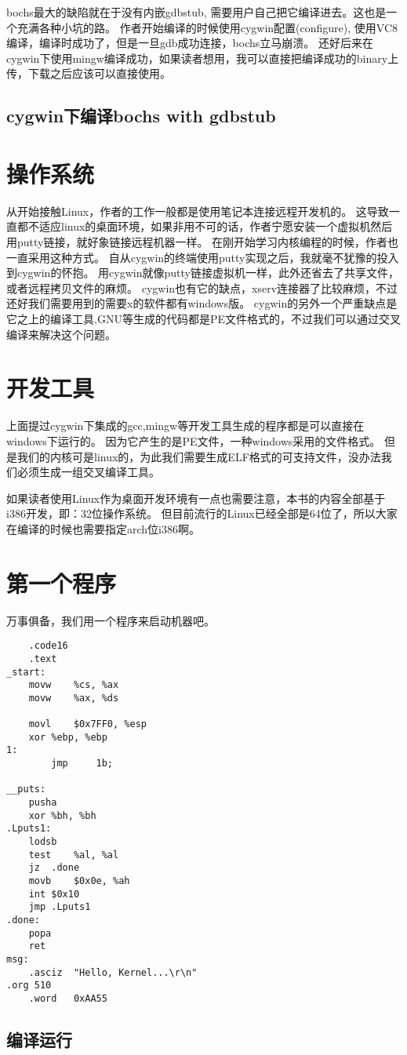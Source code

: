 bochs最大的缺陷就在于没有内嵌gdbstub, 需要用户自己把它编译进去。这也是一个充满各种小坑的路。
作者开始编译的时候使用cygwin配置(configure), 使用VC8编译，编译时成功了，但是一旦gdb成功连接，bochs立马崩溃。
还好后来在cygwin下使用mingw编译成功，如果读者想用，我可以直接把编译成功的binary上传，下载之后应该可以直接使用。

\subsection{cygwin下编译bochs with gdbstub}
\section{操作系统}
从开始接触Linux，作者的工作一般都是使用笔记本连接远程开发机的。
这导致一直都不适应linux的桌面环境，如果非用不可的话，作者宁愿安装一个虚拟机然后用putty链接，就好象链接远程机器一样。
在刚开始学习内核编程的时候，作者也一直采用这种方式。
自从cygwin的终端使用putty实现之后，我就毫不犹豫的投入到cygwin的怀抱。
用cygwin就像putty链接虚拟机一样，此外还省去了共享文件，或者远程拷贝文件的麻烦。
cygwin也有它的缺点，xserv连接器了比较麻烦，不过还好我们需要用到的需要x的软件都有windows版。
cygwin的另外一个严重缺点是它之上的编译工具,GNU等生成的代码都是PE文件格式的，不过我们可以通过交叉编译来解决这个问题。
\section{开发工具}

上面提过cygwin下集成的gcc,mingw等开发工具生成的程序都是可以直接在windows下运行的。
因为它产生的是PE文件，一种windows采用的文件格式。
但是我们的内核可是linux的，为此我们需要生成ELF格式的可支持文件，没办法我们必须生成一组交叉编译工具。

如果读者使用Linux作为桌面开发环境有一点也需要注意，本书的内容全部基于i386开发，即：32位操作系统。
但目前流行的Linux已经全部是64位了，所以大家在编译的时候也需要指定arch位i386啊。

\section{第一个程序}

万事俱备，我们用一个程序来启动机器吧。
\begin{lstlisting}
	.code16
	.text
_start:	
	movw	%cs, %ax
	movw	%ax, %ds

	movl	$0x7FF0, %esp
	xor	%ebp, %ebp
1:
        jmp     1b;

__puts:
	pusha
	xor	%bh, %bh
.Lputs1:
	lodsb
	test	%al, %al
	jz	.done
	movb	$0x0e, %ah
	int	$0x10
	jmp	.Lputs1
.done:	
	popa
	ret
msg:
	.asciz	"Hello, Kernel...\r\n"
.org 510
	.word	0xAA55
\end{lstlisting}
\subsection{编译运行}
